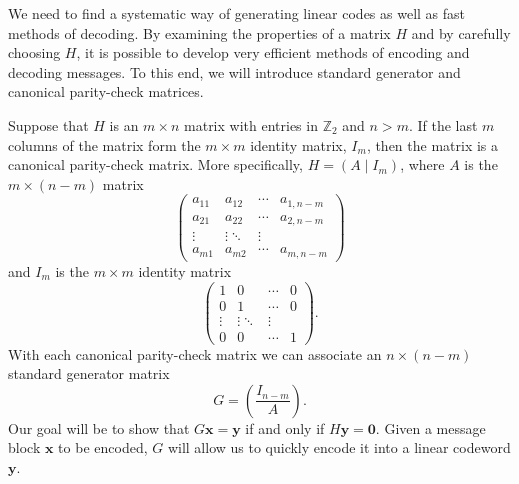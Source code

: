  
We need to find a systematic way of generating linear codes as well as
fast methods of decoding. By examining the properties of a matrix $H$
and by carefully choosing $H$, it is possible to develop very
efficient methods of encoding and decoding messages. To this end, we 
will introduce standard generator and canonical parity-check
matrices.
 
 
Suppose that $H$ is an $m \times n$ matrix with entries in
${\mathbb Z}_2$ and $n > m$. If the last $m$ columns of the
matrix form the $m \times m$ identity matrix, $I_m$, then
the matrix is a {\bfi canonical parity-check
matrix}. More specifically, $H= (A \mid I_m
)$, where $A$ is the $m \times (n-m)$ matrix
\[
\begin{pmatrix}
a_{11} & a_{12} & \cdots & a_{1,n-m} \\
a_{21} & a_{22} & \cdots & a_{2,n-m} \\
\vdots & \vdots \ddots & \vdots    \\
a_{m1} & a_{m2} & \cdots & a_{m,n-m}
\end{pmatrix}
\]
and $I_m$ is the $m \times m$ identity matrix
\[
\begin{pmatrix}
1 & 0 & \cdots & 0 \\
0 & 1 & \cdots & 0 \\
\vdots & \vdots \ddots & \vdots \\
0 & 0 & \cdots & 1
\end{pmatrix}.
\]
With each canonical parity-check matrix we can associate an $n \times
(n-m)$ {\bfi standard generator matrix} 
\[
G =
\left(
\frac{I_{n-m}}{A}
\right).
\]
Our goal will be to show that $G {\mathbf x} = {\mathbf y}$ if and only if
$H{\mathbf y} = {\mathbf 0}$.  Given a message block ${\mathbf x}$ to be
encoded, $G$ will allow us to quickly encode it into a linear
codeword ${\mathbf y}$. 
 
